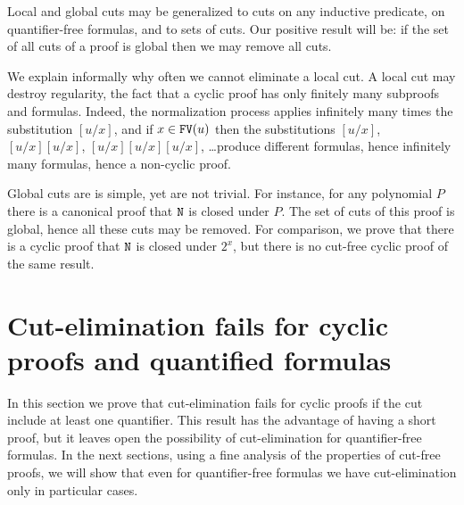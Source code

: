 \documentclass[a4paper,12pt]{article}
\newcommand{\Nat}               { {\tt N}  }
\newcommand{\FV}              { {\tt FV} }
\begin{document}
Local and global cuts may be generalized to cuts on any inductive predicate, on quantifier-free formulas, and to sets of cuts. Our positive result will be: if the set of all cuts of a proof is global then we may remove all cuts.

We explain informally why often we cannot eliminate a local cut. A local cut may destroy regularity, the fact that a cyclic proof has only finitely many subproofs and formulas. Indeed, the normalization process applies infinitely many times the substitution $[u/x]$, and if $x \in \FV(u)$ then the substitutions $[u/x]$, $[u/x][u/x]$, $[u/x][u/x][u/x]$, \ldots produce different formulas, hence infinitely many formulas, hence a non-cyclic proof. 

Global cuts are is simple, yet are not trivial. For instance, for any polynomial $P$ there is a canonical proof that $\Nat$ is closed under $P$. The set of cuts of this proof is global, hence all these cuts may be removed. For comparison, we prove that there is a cyclic proof that $\Nat$ is closed under $2^x$, but there is no cut-free cyclic proof of the same result.





\section{Cut-elimination fails for cyclic proofs and quantified formulas}
In this section we prove that cut-elimination fails for cyclic proofs if the cut include at least one quantifier. This result has the advantage of having a short proof, but it leaves open the possibility of cut-elimination for quantifier-free formulas. In the next sections, using a fine analysis of the properties of cut-free proofs, we will show that even for quantifier-free formulas we have cut-elimination only in particular cases.
\end{document}
